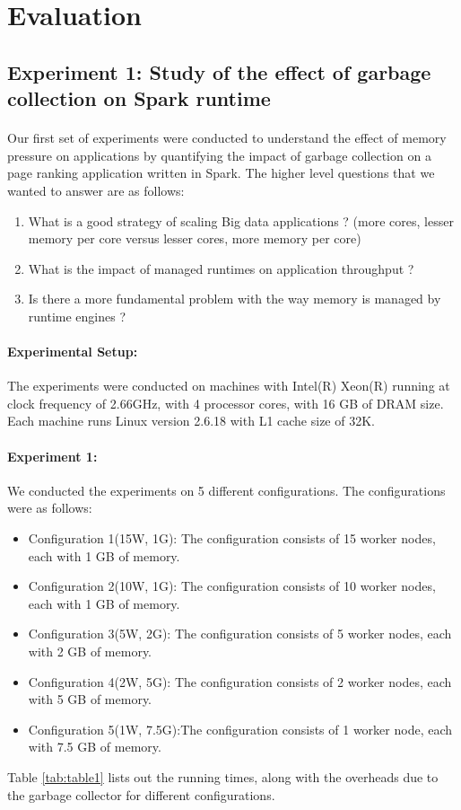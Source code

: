 \section{Evaluation}
\label{sec:eval}

\subsection{Experiment 1:  Study of the effect of garbage collection on Spark runtime}
\paragraph{}
Our first set of experiments were conducted to understand the effect of memory pressure on applications by quantifying the impact of garbage collection on a page ranking application written in Spark. The higher level questions that we wanted to answer are as follows:
\begin{enumerate}
\item What is a good strategy of scaling Big data applications ? (more cores, lesser memory per core versus lesser cores, more memory per core) 
\item What is the impact of managed runtimes on application throughput ?
\item Is there a more fundamental problem with the way memory is managed by runtime engines ?
\end{enumerate}
\paragraph{Experimental Setup:}
   	The experiments were conducted on machines with Intel(R) Xeon(R) running at clock frequency of 2.66GHz, with 4 processor cores, with 16 GB of DRAM size. Each machine runs Linux version 2.6.18 with L1 cache size of 32K.  
\paragraph{Experiment 1:}
We conducted the experiments on 5 different configurations. The configurations were as follows:
\begin{itemize}
\item Configuration 1(15W, 1G): The configuration consists of 15 worker nodes, each with 1 GB of memory.
\item Configuration 2(10W, 1G): The configuration consists of 10 worker nodes, each with 1 GB of memory.
\item Configuration 3(5W, 2G):  The configuration consists of 5 worker nodes, each with 2 GB of memory.
\item Configuration 4(2W, 5G):  The configuration consists of 2 worker nodes, each with 5 GB of memory.
\item Configuration 5(1W, 7.5G):The configuration consists of 1 worker node, each with 7.5 GB of memory.
\end{itemize}
Table \ref{tab:table1} lists out the running times, along with the overheads due to the garbage collector for different configurations.

